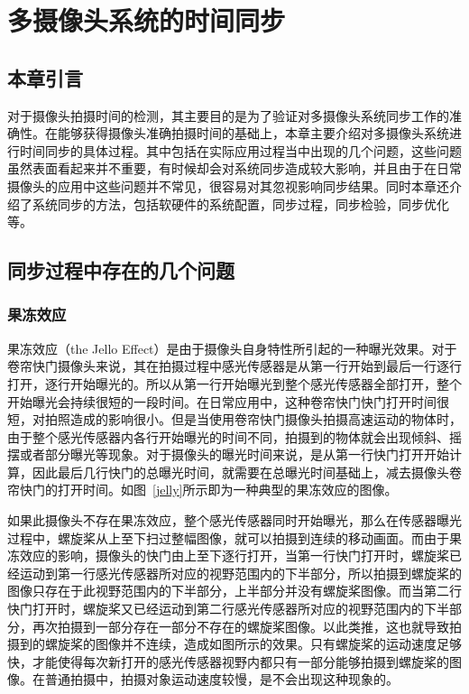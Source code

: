 

\chapter{多摄像头系统的时间同步}

\section{本章引言}

对于摄像头拍摄时间的检测，其主要目的是为了验证对多摄像头系统同步工作的准确性。在能够获得摄像头准确拍摄时间的基础上，本章主要介绍对多摄像头系统进行时间同步的具体过程。其中包括在实际应用过程当中出现的几个问题，这些问题虽然表面看起来并不重要，有时候却会对系统同步造成较大影响，并且由于在日常摄像头的应用中这些问题并不常见，很容易对其忽视影响同步结果。同时本章还介绍了系统同步的方法，包括软硬件的系统配置，同步过程，同步检验，同步优化等。

\section{同步过程中存在的几个问题}

\subsection{果冻效应}

果冻效应（the Jello Effect）是由于摄像头自身特性所引起的一种曝光效果。对于卷帘快门摄像头来说，其在拍摄过程中感光传感器是从第一行开始到最后一行逐行打开，逐行开始曝光的。所以从第一行开始曝光到整个感光传感器全部打开，整个开始曝光会持续很短的一段时间。在日常应用中，这种卷帘快门快门打开时间很短，对拍照造成的影响很小。但是当使用卷帘快门摄像头拍摄高速运动的物体时，由于整个感光传感器内各行开始曝光的时间不同，拍摄到的物体就会出现倾斜、摇摆或者部分曝光等现象。对于摄像头的曝光时间来说，是从第一行快门打开开始计算，因此最后几行快门的总曝光时间，就需要在总曝光时间基础上，减去摄像头卷帘快门的打开时间。如图~\ref{jelly}所示即为一种典型的果冻效应的图像。

如果此摄像头不存在果冻效应，整个感光传感器同时开始曝光，那么在传感器曝光过程中，螺旋桨从上至下扫过整幅图像，就可以拍摄到连续的移动画面。而由于果冻效应的影响，摄像头的快门由上至下逐行打开，当第一行快门打开时，螺旋桨已经运动到第一行感光传感器所对应的视野范围内的下半部分，所以拍摄到螺旋桨的图像只存在于此视野范围内的下半部分，上半部分并没有螺旋桨图像。而当第二行快门打开时，螺旋桨又已经运动到第二行感光传感器所对应的视野范围内的下半部分，再次拍摄到一部分存在一部分不存在的螺旋桨图像。以此类推，这也就导致拍摄到的螺旋桨的图像并不连续，造成如图所示的效果。只有螺旋桨的运动速度足够快，才能使得每次新打开的感光传感器视野内都只有一部分能够拍摄到螺旋桨的图像。在普通拍摄中，拍摄对象运动速度较慢，是不会出现这种现象的。

